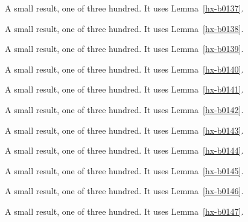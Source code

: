 \begin{lemma}[Bulk 138]\label{hx-b0138}
A small result, one of three hundred. It uses Lemma~\ref{hx-b0137}.
\end{lemma}

\begin{lemma}[Bulk 139]\label{hx-b0139}
A small result, one of three hundred. It uses Lemma~\ref{hx-b0138}.
\end{lemma}

\begin{lemma}[Bulk 140]\label{hx-b0140}
A small result, one of three hundred. It uses Lemma~\ref{hx-b0139}.
\end{lemma}

\begin{lemma}[Bulk 141]\label{hx-b0141}
A small result, one of three hundred. It uses Lemma~\ref{hx-b0140}.
\end{lemma}

\begin{lemma}[Bulk 142]\label{hx-b0142}
A small result, one of three hundred. It uses Lemma~\ref{hx-b0141}.
\end{lemma}

\begin{lemma}[Bulk 143]\label{hx-b0143}
A small result, one of three hundred. It uses Lemma~\ref{hx-b0142}.
\end{lemma}

\begin{lemma}[Bulk 144]\label{hx-b0144}
A small result, one of three hundred. It uses Lemma~\ref{hx-b0143}.
\end{lemma}

\begin{lemma}[Bulk 145]\label{hx-b0145}
A small result, one of three hundred. It uses Lemma~\ref{hx-b0144}.
\end{lemma}

\begin{lemma}[Bulk 146]\label{hx-b0146}
A small result, one of three hundred. It uses Lemma~\ref{hx-b0145}.
\end{lemma}

\begin{lemma}[Bulk 147]\label{hx-b0147}
A small result, one of three hundred. It uses Lemma~\ref{hx-b0146}.
\end{lemma}

\begin{lemma}[Bulk 148]\label{hx-b0148}
A small result, one of three hundred. It uses Lemma~\ref{hx-b0147}.
\end{lemma}

